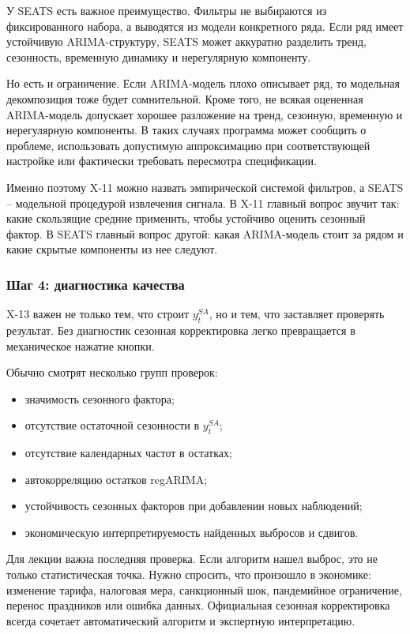 \documentclass[12pt,fleqn]{article}
\begin{document}
У SEATS есть важное преимущество.
Фильтры не выбираются из фиксированного набора, а выводятся из модели конкретного ряда.
Если ряд имеет устойчивую ARIMA-структуру, SEATS может аккуратно разделить тренд, сезонность, временную динамику и нерегулярную компоненту.

Но есть и ограничение.
Если ARIMA-модель плохо описывает ряд, то модельная декомпозиция тоже будет сомнительной.
Кроме того, не всякая оцененная ARIMA-модель допускает хорошее разложение на тренд, сезонную, временную и нерегулярную компоненты.
В таких случаях программа может сообщить о проблеме, использовать допустимую аппроксимацию при соответствующей настройке или фактически требовать пересмотра спецификации.

Именно поэтому X-11 можно назвать эмпирической системой фильтров, а SEATS -- модельной процедурой извлечения сигнала.
В X-11 главный вопрос звучит так: какие скользящие средние применить, чтобы устойчиво оценить сезонный фактор.
В SEATS главный вопрос другой: какая ARIMA-модель стоит за рядом и какие скрытые компоненты из нее следуют.

\subsubsection{Шаг 4: диагностика качества}

X-13 важен не только тем, что строит \(y_t^{SA}\), но и тем, что заставляет проверять результат.
Без диагностик сезонная корректировка легко превращается в механическое нажатие кнопки.

Обычно смотрят несколько групп проверок:

\begin{itemize}
  \item значимость сезонного фактора;
  \item отсутствие остаточной сезонности в \(y_t^{SA}\);
  \item отсутствие календарных частот в остатках;
  \item автокорреляцию остатков regARIMA;
  \item устойчивость сезонных факторов при добавлении новых наблюдений;
  \item экономическую интерпретируемость найденных выбросов и сдвигов.
\end{itemize}

Для лекции важна последняя проверка.
Если алгоритм нашел выброс, это не только статистическая точка.
Нужно спросить, что произошло в экономике: изменение тарифа, налоговая мера, санкционный шок, пандемийное ограничение, перенос праздников или ошибка данных.
Официальная сезонная корректировка всегда сочетает автоматический алгоритм и экспертную интерпретацию.
\end{document}
